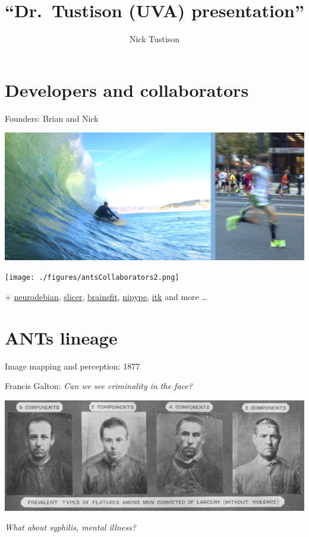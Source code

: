 \documentclass[ignorenonframetext,]{beamer}
\institute{University of Virginia}
\title{``Dr.~Tustison (UVA) presentation''}
\author{Nick Tustison}
\date{}
\begin{document}
\frame{\titlepage}

\section{Developers and
collaborators}\label{developers-and-collaborators}

\begin{frame}{Founders: Brian and Nick}

\includegraphics{./figures/brian_and_nick.png}

\end{frame}

\begin{frame}

\texttt{[image: ./figures/antsCollaborators2.png]}

\(+\) \href{http://neuro.debian.net/pkgs/ants.html}{neurodebian},
\href{http://www.slicer.org/}{slicer},
\href{https://github.com/BRAINSia/BRAINSTools}{brainsfit},
\href{http://nipy.sourceforge.net/nipype/}{nipype},
\href{http://www.itk.org}{itk} and more \ldots{}

\end{frame}

\section{ANTs lineage}\label{ants-lineage}

\begin{frame}{Image mapping and perception: 1877}

Francis Galton: \emph{Can we see criminality in the face?}

\includegraphics{./figures/galton.png}

\emph{What about syphilis, mental illness?}

\end{frame}
\end{document}
